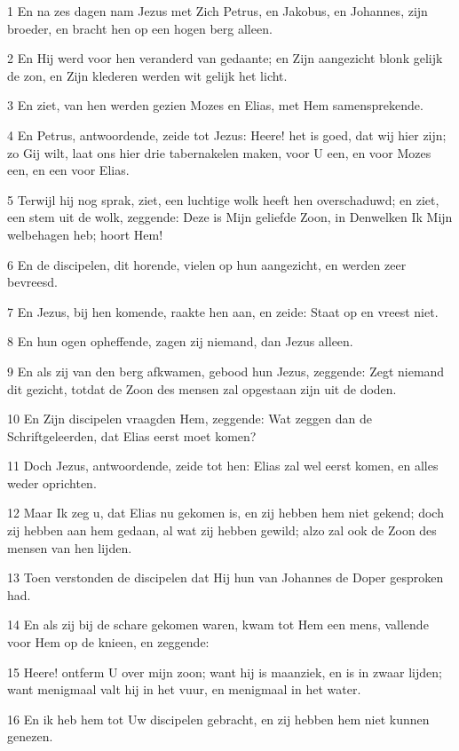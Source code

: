 \par 1 En na zes dagen nam Jezus met Zich Petrus, en Jakobus, en Johannes, zijn broeder, en bracht hen op een hogen berg alleen.
\par 2 En Hij werd voor hen veranderd van gedaante; en Zijn aangezicht blonk gelijk de zon, en Zijn klederen werden wit gelijk het licht.
\par 3 En ziet, van hen werden gezien Mozes en Elias, met Hem samensprekende.
\par 4 En Petrus, antwoordende, zeide tot Jezus: Heere! het is goed, dat wij hier zijn; zo Gij wilt, laat ons hier drie tabernakelen maken, voor U een, en voor Mozes een, en een voor Elias.
\par 5 Terwijl hij nog sprak, ziet, een luchtige wolk heeft hen overschaduwd; en ziet, een stem uit de wolk, zeggende: Deze is Mijn geliefde Zoon, in Denwelken Ik Mijn welbehagen heb; hoort Hem!
\par 6 En de discipelen, dit horende, vielen op hun aangezicht, en werden zeer bevreesd.
\par 7 En Jezus, bij hen komende, raakte hen aan, en zeide: Staat op en vreest niet.
\par 8 En hun ogen opheffende, zagen zij niemand, dan Jezus alleen.
\par 9 En als zij van den berg afkwamen, gebood hun Jezus, zeggende: Zegt niemand dit gezicht, totdat de Zoon des mensen zal opgestaan zijn uit de doden.
\par 10 En Zijn discipelen vraagden Hem, zeggende: Wat zeggen dan de Schriftgeleerden, dat Elias eerst moet komen?
\par 11 Doch Jezus, antwoordende, zeide tot hen: Elias zal wel eerst komen, en alles weder oprichten.
\par 12 Maar Ik zeg u, dat Elias nu gekomen is, en zij hebben hem niet gekend; doch zij hebben aan hem gedaan, al wat zij hebben gewild; alzo zal ook de Zoon des mensen van hen lijden.
\par 13 Toen verstonden de discipelen dat Hij hun van Johannes de Doper gesproken had.
\par 14 En als zij bij de schare gekomen waren, kwam tot Hem een mens, vallende voor Hem op de knieen, en zeggende:
\par 15 Heere! ontferm U over mijn zoon; want hij is maanziek, en is in zwaar lijden; want menigmaal valt hij in het vuur, en menigmaal in het water.
\par 16 En ik heb hem tot Uw discipelen gebracht, en zij hebben hem niet kunnen genezen.
